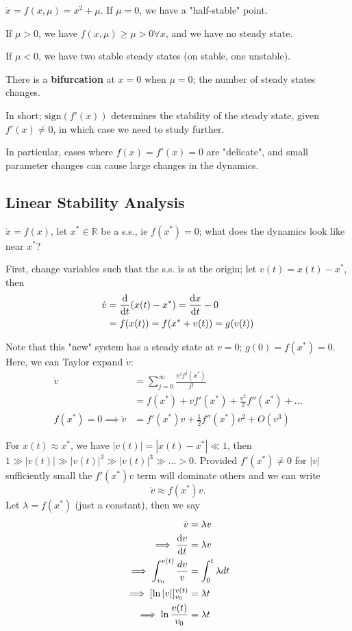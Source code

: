 \documentclass[12pt, oneside]{article}
\begin{document}
\begin{example}
  $\dot{x} = f(x, \mu) = x^2 + \mu$. If $\mu = 0$, we have a "half-stable" point. 

  If $\mu > 0$, we have $f(x,\mu) \geq \mu > 0 \forall x$, and we have no steady state.

  If $\mu < 0$, we have two stable steady states (on stable, one unstable).

  There is a \textbf{bifurcation} at $x=0$ when $\mu = 0$; the number of steady states changes.
\end{example}

In short; $\text{sign}(f'(x))$ determines the stability of the steady state, given $f'(x) \neq 0$, in which case we need to study further.

In particular, cases where $f(x)=f'(x)=0$ are "delicate", and small parameter changes can cause large changes in the dynamics.

\subsection{Linear Stability Analysis}

$\dot{x} = f(x)$, let $x^{*} \in \mathbb{R}$ be a s.s., ie $f(x^*) = 0$; what does the dynamics look like near $x^*$?

First, change variables such that the s.s. is at the origin; let $v(t) = x(t) -x^*$, then 
\begin{align*}
  \dot{v} &= \dv{t}(x(t)-x^*)=\dv{x}{t}-0\\
  &= f(x(t)) = f(x^* + v(t)) = g(v(t))
\end{align*}

Note that this "new" system has a steady state at $v=0$; $g(0) = f(x^*) = 0$. Here, we can Taylor expand $\dot{v}$:
\begin{align*}
  \dot{v} &= \sum_{j=0}^\infty \frac{v^j f^{j}(x^*)}{j!}\\
  &= f(x^*) + v f'(x^*) + \frac{v^2}{2} f''(x^*) + \dots\\
  f(x^*) = 0 \implies \dot{v} &= f'(x^*)v+\frac{1}{2}f''(x^*)v^2 + O(v^3)
\end{align*}

For $x(t) \approx x^*$, we have $|v(t)| = |x(t) - x^*| \ll 1$, then $1 \gg |v(t)| \gg |v(t)|^2 \gg |v(t)|^3 \gg \dots > 0$. Provided $f'(x^*)\neq 0$ for $|v|$ sufficiently small the $f'(x^*) v$ term will dominate others and we can write \[\dot{v} \approx f(x^*)v.\]
Let $\lambda = f(x^*)$ (just a constant), then we say 
\begin{align*}
  \dot{v} &= \lambda v\\
  \implies \dv{v}{t} &= \lambda v\\
  \implies \int_{v_0}^{v(t)}\frac{dv}{v} &= \int_0^t \lambda dt\\
  \implies [\ln |v|]_{v_0}^{v(t)} &= \lambda t\\
  \implies \ln \frac{v(t)}{v_0} &= \lambda t
\end{align*}
\end{document}
